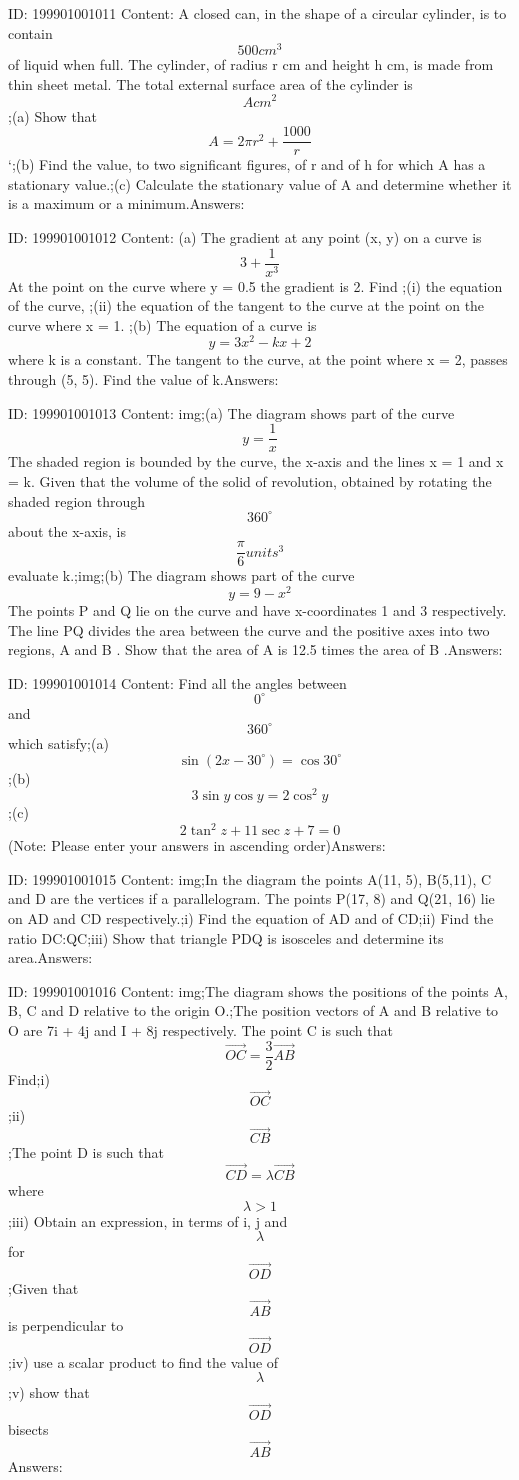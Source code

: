 \documentclass{article}
\begin{document}
ID: 199901001011
Content:
A closed can, in the shape of a circular cylinder, is to contain \[500cm^3\] of liquid when full. The cylinder, of radius r cm and height h cm, is made from thin sheet metal. The total external surface area of the cylinder is \[A cm^2\] ;(a) Show that \[A=2\pi r^2+\frac{1000}{r}\] `;(b) Find the value, to two significant figures, of r and of h for which A has a stationary value.;(c) Calculate the stationary value of A and determine whether it is a maximum or a minimum.Answers:

ID: 199901001012
Content:
(a)	The gradient at any point (x, y) on a curve is \[3+\frac{1}{x^{3}}\] At the point on the curve where y = 0.5 the gradient is 2. Find ;(i)	the equation of the curve, ;(ii)	the equation of the tangent to the curve at the point on the curve where x = 1. ;(b) The equation of a curve is \[y=3x^2-kx+2\] where k is a constant. The tangent to the curve, at the point where x = 2, passes through (5, 5). Find the value of k.Answers:

ID: 199901001013
Content:
img;(a) The diagram shows part of the curve \[y=\frac{1}{x}\] The shaded region is bounded by the curve, the x-axis and the lines x = 1 and x = k. Given that the volume of the solid of revolution, obtained by rotating the shaded region through  \[360^{\circ}\]   about the x-axis, is \[\frac{\pi}{6}units^3\] evaluate k.;img;(b) The diagram shows part of the curve \[y=9-x^2\] The points P and Q lie on the curve and have x-coordinates 1 and 3 respectively. The line PQ divides the area between the curve and the positive axes into two regions, A and B . Show that the area of A is 12.5 times the area of B .Answers:

ID: 199901001014
Content:
Find all the angles between \[0^{\circ}\]  and  \[360^{\circ}\]   which satisfy;(a) \[\sin(2x-30^{\circ})=\cos30^{\circ}\];(b) \[3\sin y\cos y=2\cos^2y\];(c) \[2\tan^2z+11\sec z+7=0\](Note: Please enter your answers in ascending order)Answers:

ID: 199901001015
Content:
img;In the diagram the points A(11, 5), B(5,11), C and D are the vertices if a parallelogram. The points P(17, 8) and Q(21, 16) lie on AD and CD respectively.;i) Find the equation of AD and of CD;ii) Find the ratio DC:QC;iii) Show that triangle PDQ is isosceles and determine its area.Answers:

ID: 199901001016
Content:
img;The diagram shows the positions of the points A, B, C and D relative to the origin O.;The position vectors of A and B relative to O are 7i + 4j and I + 8j respectively. The point C is such that \[\vec{OC}=\frac{3}{2}\vec{AB}\] Find;i) \[\vec{OC}\];ii) \[\vec{CB}\];The point D is such that \[\vec{CD}=\lambda \vec{CB}\]  where \[\lambda >1\];iii) Obtain an expression, in terms of i, j and \[\lambda\] for \[\vec{OD}\];Given that \[\vec{AB}\]is perpendicular to \[\vec{OD}\];iv) use a scalar product to find the value of \[\lambda\];v) show that \[\vec{OD}\] bisects \[\vec{AB}\]Answers:
\end{document}
